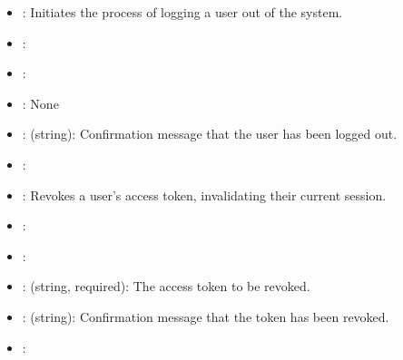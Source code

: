 \documentclass[letterpaper,10pt,english]{sphinxmanual}
\begin{document}
\sphinxAtStartPar
{}
\begin{itemize}
\item {} 
\sphinxAtStartPar
{}: Initiates the process of logging a user out of the system.

\item {} 
\sphinxAtStartPar
{}: 

\item {} 
\sphinxAtStartPar
{}: 

\item {} 
\sphinxAtStartPar
{}: None

\item {} 
\sphinxAtStartPar
{}:
\sphinxhyphen{}  (string): Confirmation message that the user has been logged out.

\item {} 
\sphinxAtStartPar
{}: 

\end{itemize}

\sphinxAtStartPar
{}
\begin{itemize}
\item {} 
\sphinxAtStartPar
{}: Revokes a user’s access token, invalidating their current session.

\item {} 
\sphinxAtStartPar
{}: 

\item {} 
\sphinxAtStartPar
{}: 

\item {} 
\sphinxAtStartPar
{}:
\sphinxhyphen{}  (string, required): The access token to be revoked.

\item {} 
\sphinxAtStartPar
{}:
\sphinxhyphen{}  (string): Confirmation message that the token has been revoked.

\item {} 
\sphinxAtStartPar
{}: 

\end{itemize}
\end{document}
